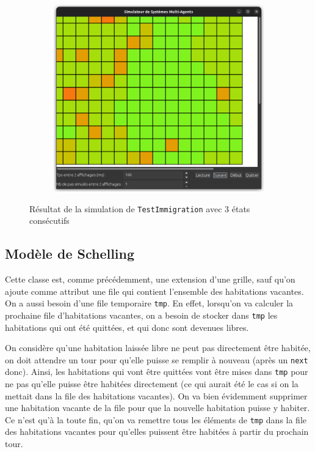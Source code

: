 \documentclass[a4paper, 11pt, french]{article}
\begin{document}
\begin{figure}[H]
\hfill
\begin{subfigure}{0.3\textwidth}
    \includegraphics[width=\textwidth]{TestImmigration3.png}
\end{subfigure}
\caption{Résultat de la simulation de \texttt{TestImmigration} avec 3 états consécutifs}
\end{figure}

\subsection{Modèle de Schelling}

Cette classe est, comme précédemment, une extension d'une grille, sauf qu'on ajoute comme attribut une file qui contient l'ensemble des habitations vacantes. On a aussi besoin d'une file temporaire \verb|tmp|. En effet, lorsqu'on va calculer la prochaine file d'habitations vacantes, on a besoin de stocker dans \verb|tmp| les habitations qui ont été quittées, et qui donc sont devenues libres.

On considère qu'une habitation laissée libre ne peut pas directement être habitée, on doit attendre un tour pour qu'elle puisse se remplir à nouveau (après un \verb|next| donc). Ainsi, les habitations qui vont être quittées vont être mises dans \verb|tmp| pour ne pas qu'elle puisse être habitées directement (ce qui aurait été le cas si on la mettait dans la file des habitations vacantes). On va bien évidemment supprimer une habitation vacante de la file pour que la nouvelle habitation puisse y habiter. Ce n'est qu'à la toute fin, qu'on va remettre tous les éléments de \verb|tmp| dans la file des habitations vacantes pour qu'elles puissent être habitées à partir du prochain tour.
\end{document}
